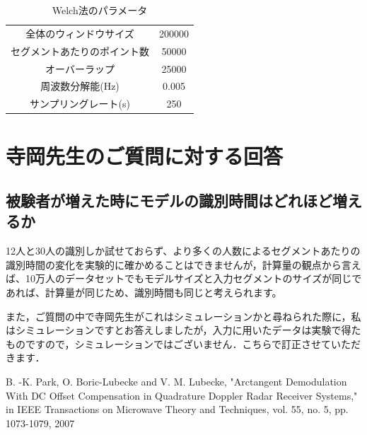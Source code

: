 \documentclass[dvipdfmx]{jsarticle}
\begin{document}
\begin{table}[H]
\caption{Welch法のパラメータ}
\centering
\begin{tabular}{cc}
\hline
全体のウィンドウサイズ & 200000 \\
セグメントあたりのポイント数 & 50000 \\
オーバーラップ & 25000 \\
周波数分解能(Hz) & 0.005 \\
サンプリングレート(s) & 250 \\
\hline
\end{tabular}
\end{table}

\section{寺岡先生のご質問に対する回答}
\subsection*{被験者が増えた時にモデルの識別時間はどれほど増えるか}
12人と30人の識別しか試せておらず、より多くの人数によるセグメントあたりの識別時間の変化を実験的に確かめることはできませんが，計算量の観点から言えば、10万人のデータセットでもモデルサイズと入力セグメントのサイズが同じであれば、計算量が同じため、識別時間も同じと考えられます。

また，ご質問の中で寺岡先生がこれはシミュレーションかと尋ねられた際に，私はシミュレーションですとお答えしましたが，入力に用いたデータは実験で得たものですので，シミュレーションではございません．こちらで訂正させていただきます．

\begin{thebibliography}{99}
     B. -K. Park, O. Boric-Lubecke and V. M. Lubecke, "Arctangent Demodulation With DC Offset Compensation in Quadrature Doppler Radar Receiver Systems," in IEEE Transactions on Microwave Theory and Techniques, vol. 55, no. 5, pp. 1073-1079, 2007
\end{thebibliography}
\end{document}

